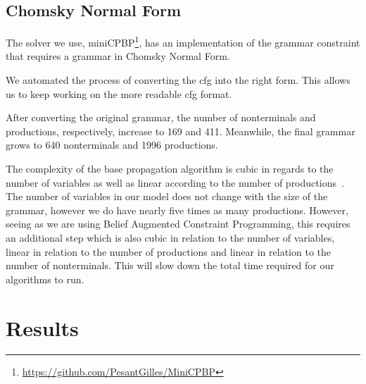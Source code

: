 \documentclass[../Document.tex]{subfiles}
\begin{document}
\subsection{Chomsky Normal Form}
The solver we use, miniCPBP\footnote{\url{https://github.com/PesantGilles/MiniCPBP}}, has an implementation of the grammar constraint that requires a grammar in Chomsky Normal Form.


We automated the process of converting the \gls{cfg} into the right form. This allows us to keep working on the more readable \gls{cfg} format.

After converting the original grammar, the number of nonterminals and productions, respectively, increase to 169 and 411. Meanwhile, the final grammar grows to 640 nonterminals and 1996 productions.

The complexity of the base propagation algorithm is cubic in regards to the number of variables as well as linear according to the number of productions~\cite{quimper2006}. The number of variables in our model does not change with the size of the grammar, however we do have nearly five times as many productions.
However, seeing as we are using Belief Augmented Constraint Programming, this requires an additional step which is also cubic in relation to the number of variables, linear in relation to the number of productions and linear in relation to the number of nonterminals.
This will slow down the total time required for our algorithms to run.


\section{Results}
\end{document}

